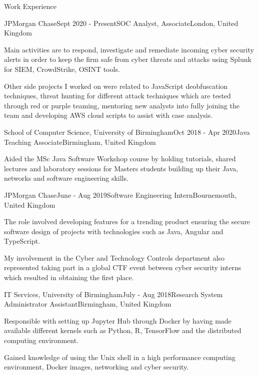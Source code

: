 \documentclass{resume} %
\begin{document}

\begin{rSection}{Work Experience}

\begin{rSubsection}{JPMorgan Chase}{Sept 2020 - Present}{SOC Analyst, Associate}{London, United Kingdom}
\item Main activities are to respond, investigate and remediate incoming cyber security alerts in order to keep the firm safe from cyber threats and attacks using Splunk for SIEM, CrowdStrike, OSINT tools.
\item Other side projects I worked on were related to JavaScript deobfuscation techniques, threat hunting for different attack techniques which are tested through red or purple teaming, mentoring new analysts into fully joining the team and developing AWS cloud scripts to assist with case analysis.
\end{rSubsection}

\begin{rSubsection}{School of Computer Science, University of Birmingham}{Oct 2018 - Apr 2020}{Java Teaching Associate}{Birmingham, United Kingdom}
\item Aided the MSc Java Software Workshop course by holding tutorials, shared lectures and laboratory sessions for Masters students building up their Java, networks and software engineering skills.
\end{rSubsection}

\begin{rSubsection}{JPMorgan Chase}{June - Aug 2019}{Software Engineering Intern}{Bournemouth, United Kingdom}
\item The role involved developing features for a trending product ensuring the secure software design of projects with technologies such as Java, Angular and TypeScript.
\item My involvement in the Cyber and Technology Controls department also represented taking part in a global CTF event between cyber security interns which resulted in obtaining the first place.
\end{rSubsection}

\begin{rSubsection}{IT Services, University of Birmingham}{July - Aug 2018}{Research System Administrator Assistant}{Birmingham, United Kingdom}
\item Responsible with setting up Jupyter Hub through Docker by having made available different kernels such as Python, R, TensorFlow and the distributed computing environment.
\item Gained knowledge of using the Unix shell in a high performance computing environment, Docker images, networking and cyber security.
\end{rSubsection}

\end{rSection}
\end{document}
